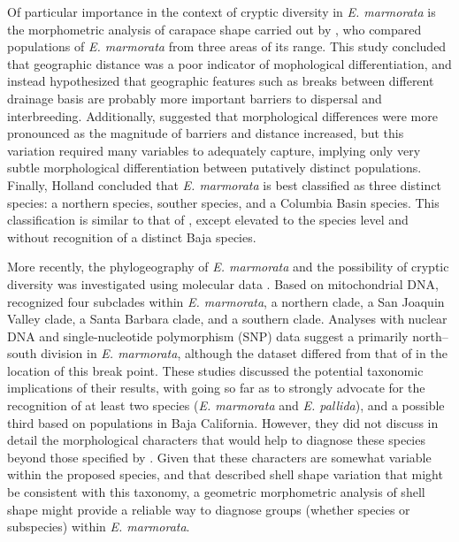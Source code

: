 \documentclass[12pt,letterpaper]{article}
\begin{document}
Of particular importance in the context of cryptic diversity in \textit{E. marmorata} is the morphometric analysis of carapace shape carried out by \citet{Holland1992}, who compared populations of \textit{E. marmorata} from three areas of its range. This study concluded that geographic distance was a poor indicator of mophological differentiation, and instead hypothesized that geographic features such as breaks between different drainage basis are probably more important barriers to dispersal and interbreeding. Additionally, \citep{Holland1992} suggested that morphological differences were more pronounced as the magnitude of barriers and distance increased, but this variation required many variables to adequately capture, implying only very subtle morphological differentiation between putatively distinct populations. Finally, Holland concluded that \textit{E. marmorata} is best classified as three distinct species: a northern species, souther species, and a Columbia Basin species. This classification is similar to that of \citet{Seeliger1945}, except elevated to the species level and without recognition of a distinct Baja species. 

More recently, the phylogeography of \textit{E. marmorata} and the possibility of cryptic diversity was investigated using molecular data \citep{Spinks2005,Spinks2010,Spinks2014}. Based on mitochondrial DNA, \citet{Spinks2005} recognized four subclades within \textit{E. marmorata}, a northern clade, a San Joaquin Valley clade, a Santa Barbara clade, and a southern clade. Analyses with nuclear DNA \citep{Spinks2010} and single-nucleotide polymorphism (SNP) data suggest a primarily north--south division in \textit{E. marmorata}, although the dataset differed from that of \citet{Spinks2005} in the location of this break point. These studies discussed the potential taxonomic implications of their results, with \citet{Spinks2014} going so far as to strongly advocate for the recognition of at least two species (\emph{E. marmorata} and \emph{E. pallida}), and a possible third based on populations in Baja California. However, they did not discuss in detail the morphological characters that would help to diagnose these species beyond those specified by \citet{Seeliger1945}. Given that these characters are somewhat variable within the proposed species, and that \citet{Holland1992} described shell shape variation that might be consistent with this taxonomy, a geometric morphometric analysis of shell shape might provide a reliable way to diagnose groups (whether species or subspecies) within \textit{E. marmorata}.
\end{document}

